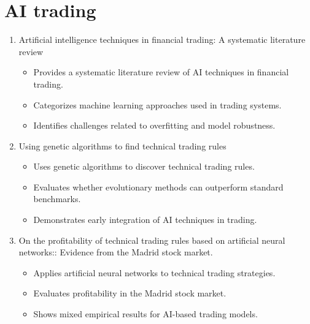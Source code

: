 \section{AI trading}
    \begin{enumerate}
    
        \item Artificial intelligence techniques in financial trading: A systematic literature review
        \cite {dakalbab2024artificial}

        \begin{itemize}
        \item Provides a systematic literature review of AI techniques in financial trading.
        \item Categorizes machine learning approaches used in trading systems.
        \item Identifies challenges related to overfitting and model robustness.
        \end{itemize}
        
        \item Using genetic algorithms to find technical trading rules
        \cite {allen1999using}

        \begin{itemize}
        \item Uses genetic algorithms to discover technical trading rules.
        \item Evaluates whether evolutionary methods can outperform standard
        benchmarks.
        \item Demonstrates early integration of AI techniques in trading.
        \end{itemize}
        
        \item On the profitability of technical trading rules based on artificial neural networks:: Evidence from the Madrid stock market.
        \cite {fernandez2000profitability}

        \begin{itemize}
        \item Applies artificial neural networks to technical trading strategies.
        \item Evaluates profitability in the Madrid stock market.
        \item Shows mixed empirical results for AI-based trading models.
        \end{itemize}
        
    \end{enumerate}


